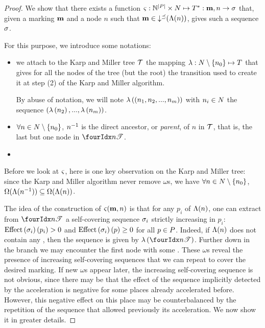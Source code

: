 \begin{proof}
  We show that there exists a function $\Tts : \naturals^{\card{\places}} \times \nodes \mapsto \transitions^* : \mar, n \rightarrow \seqt$ that, given a marking $\mathbf{m}$ and a node $n$ such that $\mathbf{m} \in \operatorname{\downarrow^\preceq}(\operatorname{\Lambda}(n))$, gives such a sequence $\seqt$.

  For this purpose, we introduce some notations:
  \begin{itemize}
    \item we attach to the Karp and Miller tree $\mathcal{T}$ the mapping $\operatorname{\lambda} : N \setminus \{n_0\} \mapsto T$ that gives for all the nodes of the tree (but the root) the transition used to create it at step (2) of the Karp and Miller algorithm.

      By abuse of notation, we will note $\operatorname{\lambda}\left({(n_1, n_2, ..., n_m)}\right)$
      with  $n_i \in N$
      the sequence $(\operatorname{\lambda}\left({n_2}\right), ..., \operatorname{\lambda}\left({n_m}\right))$.
    \item $\forall n \in N \setminus \{n_0\}$, $n^{-1}$ is the direct ancestor, or \emph{parent}, of $n$ in $\mathcal{T}$, that is, the last but one node in $\treepath{n}$.
    \item {}
  \end{itemize}

  Before we look at $\operatorname{\varsigma}$, here is one key observation on the Karp and Miller tree:
  since the Karp and Miller algorithm never remove $\omega$s, we have
  $\forall n \in N \setminus \{n_0\}$, $\operatorname{\Omega}(\operatorname{\Lambda}(n^{-1})) \subseteq \operatorname{\Omega}(\operatorname{\Lambda}(n))$.

  The idea of the construction of $\operatorname{\varsigma}(\mathbf{m},n)$ is that for any \oplace $p_i$ of $\operatorname{\Lambda}(n)$, one can extract from $\treepath{n}$ a self-covering sequence $\seqt_i$ strictly increasing in $p_i$:
  $\effect{\seqt_i}(p_i) > 0$ and $\effect{\seqt_i}(p) \geq 0$ for all $p \in P$.
  Indeed, if $\operatorname{\Lambda}(n)$ does not contain any \oplace, then the sequence is given by $\labt{\treepath{n}}$.
  Further down in the branch we may encounter the first node with some \oplaces.
  These $\omega$s reveal the presence of increasing self-covering sequences that we can repeat to cover the desired marking.
  If new $\omega$s appear later, the  increasing self-covering sequence is not obvious, since there may be that the effect of the sequence implicitly detected by the acceleration is negative for some places already accelerated before.
  However, this negative effect on this place may be counterbalanced by the repetition of the sequence that allowed previously its acceleration.
  We now show it in greater details.


\end{proof}
